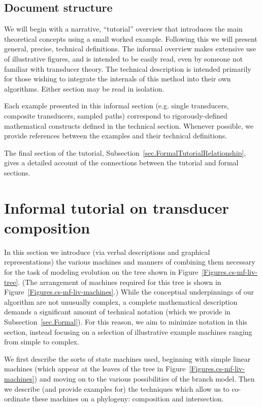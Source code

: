 \documentclass{article}
\newcommand{\secref}[1]{Subsection~\ref{sec.#1}}
\newcommand{\figref}[1]{Figure~\ref{Figures.#1}}
\begin{document}
\subsection{Document structure}  
We will begin with a narrative, ``tutorial'' overview that introduces the main
 theoretical concepts using a small worked example.
Following this we will present general, precise, technical definitions.
The informal overview makes extensive use of illustrative figures,
and is intended to be easily read, even by someone not familiar with transducer theory. 
The technical description is intended primarily for those wishing to integrate the 
internals of this method into their own algorithms.  
Either section may be read in isolation.

Each example presented in this informal section
 (e.g. single transducers, composite transducers, sampled paths) 
correspond to rigorously-defined mathematical constructs defined in the technical section. 
Whenever possible, we provide references between the examples and their technical definitions.

The final section of the tutorial, \secref{FormalTutorialRelationship}, gives a detailed account of the connections between the tutorial and formal sections.

\section{Informal tutorial on transducer composition}

In this section we introduce (via verbal descriptions and graphical representations)
the various machines and manners of combining them necessary for the
task of modeling evolution on the tree shown in  \figref{cs-mf-liv-tree}.  
(The arrangement of machines required for this tree is shown in \figref{cs-mf-liv-machines}.)
While the conceptual underpinnings of our algorithm are not unusually complex, 
a complete mathematical description demands a significant amount of technical notation (which we provide in \secref{Formal}). 
For this reason, we aim to minimize notation in this section,
instead focusing on a selection of illustrative example machines ranging from simple to complex. 

We first describe the sorts of state machines used, beginning
 with simple linear machines
 (which appear at the leaves of the tree in \figref{cs-mf-liv-machines}) 
and moving on to the various possibilities of the branch model. 
Then we describe (and provide examples for) the techniques which allow us to 
co-ordinate these machines on a phylogeny: composition and intersection. 
\end{document}
